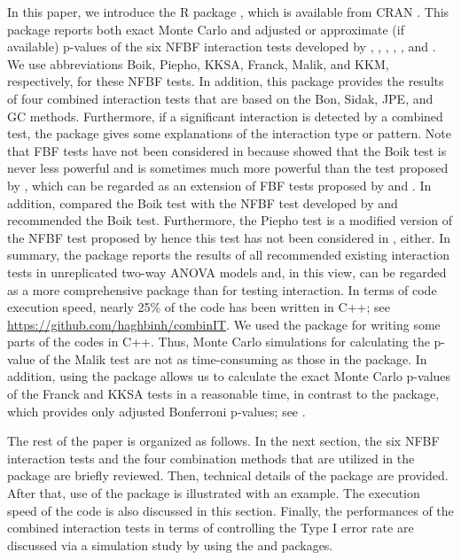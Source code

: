 In this paper, we introduce the R package , which is available from CRAN  \citep{SHKKN:2022}. This package reports both exact Monte Carlo and adjusted or approximate (if available) p-values of the six NFBF interaction tests developed by \citet{Boik:1993}, \citet{Piepho:1994}, \citet{KKSA:2007}, \citet{Franck:2013}, \citet{Malik:2016}, and \citet{KKM:2016}. We use abbreviations Boik, Piepho, KKSA, Franck, Malik, and KKM, respectively, for these NFBF tests. In addition, this package provides the results of four combined interaction tests that are based on the Bon, Sidak, JPE, and GC methods. Furthermore, if a significant interaction is detected by a combined test, the package  gives some explanations of the interaction type or pattern. Note that FBF tests have not been considered in  because \citet{Boik:1993b} showed that the Boik test is never less powerful and is sometimes much more powerful than the test proposed by \citet{JG:1972}, which can be regarded as an extension of FBF tests proposed by \citet{Tukey:1949} and \citet{Mandel:1961, Mandel:1971}. In addition, \citet{Boik:1993b} compared the Boik test with the NFBF test developed by \citet{Tusell:1990} and recommended the Boik test. Furthermore, the Piepho test is a modified version of the NFBF test proposed by \citet{MR:1977} hence this test has not been considered in , either. In summary, the  package reports the results of all recommended existing interaction tests in unreplicated two-way ANOVA models and, in this view, can be regarded as a more comprehensive package than  for testing interaction. In terms of code execution speed, nearly 25\% of the code has been written in C++; see \url{https://github.com/haghbinh/combinIT}. We used the  package \citep{RcppArticle1, RcppBook, RcppArticle2} for writing some parts of the codes in C++. Thus, Monte Carlo simulations for calculating the p-value of the Malik test are not as time-consuming as those in the  package. In addition, using the  package allows us to calculate the exact Monte Carlo p-values of the Franck and KKSA tests in a reasonable time, in contrast to the  package, which provides only adjusted Bonferroni p-values; see \citet{Franck:2016}.

The rest of the paper is organized as follows. In the next section, the six NFBF interaction tests and the four combination methods that are utilized in the  package are briefly reviewed. Then, technical details of the  package {are provided}. After that, use of the package  is illustrated with an example. The execution speed of the code is also discussed in this section. Finally, the performances of the combined interaction tests in terms of controlling the {Type I error} rate are discussed via a simulation study by using the  and  packages.

